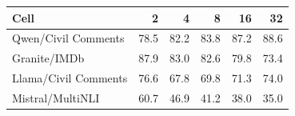 \begin{tabular}{lrrrrr}
\toprule
Cell & 2 & 4 & 8 & 16 & 32 \\
\midrule
Qwen/Civil Comments & 78.5 & 82.2 & 83.8 & 87.2 & 88.6 \\
Granite/IMDb & 87.9 & 83.0 & 82.6 & 79.8 & 73.4 \\
Llama/Civil Comments & 76.6 & 67.8 & 69.8 & 71.3 & 74.0 \\
Mistral/MultiNLI & 60.7 & 46.9 & 41.2 & 38.0 & 35.0 \\
\bottomrule
\end{tabular}
